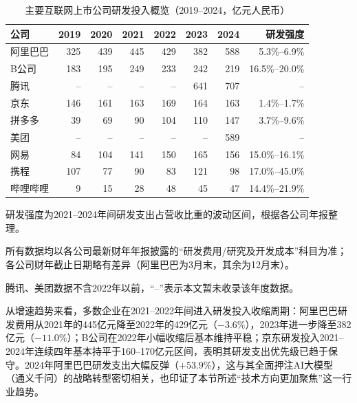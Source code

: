 \begin{table}[htbp]
\centering
\caption{主要互联网上市公司研发投入概览（2019--2024，亿元人民币）}
\label{tab:rd-investment-companies}
\begin{threeparttable}
\begin{tabular}{lrrrrrrr}
\toprule
\textbf{公司} & \textbf{2019} & \textbf{2020} & \textbf{2021} & \textbf{2022} & \textbf{2023} & \textbf{2024} & \textbf{研发强度\tnote{①}} \\
\midrule
阿里巴巴 & 325 & 439 & 445 & 429 & 382 & 588 & 5.3\%--6.9\% \\
B公司     & 183 & 195 & 249 & 233 & 242 & 219 & 16.5\%--20.0\% \\
腾讯     & --  & --  & --  & --  & 641 & 707 & -- \\
京东     & 146 & 161 & 163 & 169 & 164 & 163 & 1.4\%--1.7\% \\
拼多多   & 39  & 69  & 90  & 104 & 110 & 147 & 3.7\%--9.6\% \\
美团     & --  & --  & --  & --  & --  & 589 & -- \\
网易     & 84  & 104 & 141 & 150 & 165 & 156 & 15.0\%--16.1\% \\
携程     & 107 & 77  & 90  & 83  & 121 & 98  & 17.0\%--45.0\% \\
哔哩哔哩 & 9   & 15  & 28  & 48  & 45  & 47  & 14.4\%--21.9\% \\
\bottomrule
\end{tabular}
\begin{tablenotes}
\small
\item[①] 研发强度为2021--2024年间研发支出占营收比重的波动区间，根据各公司年报整理。
\item 所有数据均以各公司最新财年年报披露的“研发费用/研究及开发成本”科目为准；各公司财年截止日期略有差异（阿里巴巴为3月末，其余为12月末）。
\item 腾讯、美团数据不含2022年以前，“--”表示本文暂未收录该年度数据。
\end{tablenotes}
\end{threeparttable}
\end{table}

从增速趋势来看，多数企业在2021--2022年间进入研发投入收缩周期：阿里巴巴研发费用从2021年的445亿元降至2022年的429亿元（$-3.6\%$），2023年进一步降至382亿元（$-11.0\%$）；B公司在2022年小幅收缩后基本维持平稳；京东研发投入2021--2024年连续四年基本持平于160--170亿元区间，表明其研发支出优先级已趋于保守。2024年阿里巴巴研发支出大幅反弹（$+53.9\%$），这与其全面押注AI大模型（通义千问）的战略转型密切相关，也印证了本节所述“技术方向更加聚焦”这一行业趋势。

